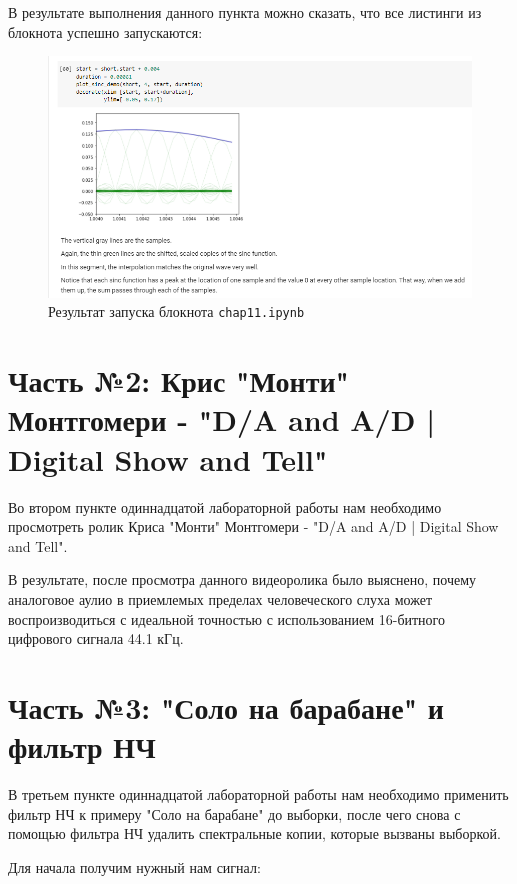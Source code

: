 \documentclass[a4paper]{article}
\begin{document}
            В результате выполнения данного пункта можно сказать, что все листинги из блокнота успешно запускаются:
            
            \begin{figure}[H]
                \centering
                \includegraphics[width=\textwidth]{ex_1_1.png}
                \caption{Результат запуска блокнота \texttt{chap11.ipynb}}
                \label{fig:ex_1_1}
            \end{figure}
            
    \newpage
        \section{Часть №2: Крис "Монти" Монтгомери - "D/A and A/D | Digital Show and Tell"}
            Во втором пункте одиннадцатой лабораторной работы нам необходимо просмотреть ролик Криса "Монти" Монтгомери - "D/A and A/D | Digital Show and Tell".
            
            В результате, после просмотра данного видеоролика было выяснено, почему аналоговое аулио в приемлемых пределах человеческого слуха может воспроизводиться с идеальной точностью с использованием 16-битного цифрового сигнала 44.1 кГц.
            
    \newpage
        \section{Часть №3: "Соло на барабане" и фильтр НЧ}
            В третьем пункте одиннадцатой лабораторной работы нам необходимо применить фильтр НЧ к примеру "Соло на барабане" до выборки, после чего снова с помощью фильтра НЧ удалить спектральные копии, которые вызваны выборкой.
            
            Для начала получим нужный нам сигнал:
            
\end{document}

